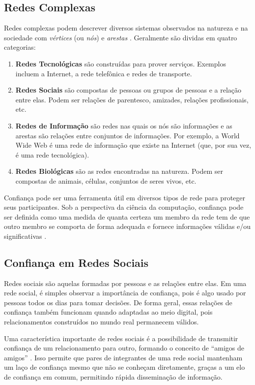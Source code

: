 \begin{resumoextendido}
	\subsection*{Redes Complexas}
	Redes complexas podem descrever diversos sistemas observados na natureza e na sociedade com \textit{vértices} (ou \textit{nós}) e \textit{arestas} \citep{newmannetworks}.
	Geralmente são dividas em quatro categorias:
	\begin{enumerate}
		\item \textbf{Redes Tecnológicas} são construídas para prover serviços. Exemplos incluem a Internet, a rede telefônica e redes de transporte.
		\item \textbf{Redes Sociais} são compostas de pessoas ou grupos de pessoas e a relação entre elas. Podem ser relações de parentesco, amizades, relações profissionais, etc.
		\item \textbf{Redes de Informação} são redes nas quais os nós são informações e as arestas são relações entre conjuntos de informações. Por exemplo, a World Wide Web é uma rede de informação que existe na Internet (que, por sua vez, é uma rede tecnológica).
		\item \textbf{Redes Biológicas} são as redes encontradas na natureza. Podem ser compostas de animais, células, conjuntos de seres vivos, etc.
	\end{enumerate}
	
	Confiança pode ser uma ferramenta útil em diversos tipos de rede para proteger seus participantes.
	Sob a perspectiva da ciência da computação, confiança pode ser definida como uma medida de quanta certeza um membro da rede tem de que outro membro se comporta de forma adequada e fornece informações válidas e/ou significativas \citep{sherchan2013survey}.
	
	\subsection*{Confiança em Redes Sociais}
	Redes sociais são aquelas formadas por pessoas e as relações entre elas. 
	Em uma rede social, é simples observar a importância de confiança, pois é algo usado por pessoas todos os dias para tomar decisões.
	De forma geral, essas relações de confiança também funcionam quando adaptadas ao meio digital, pois relacionamentos construídos no mundo real permanecem válidos.
	
	Uma característica importante de redes sociais é a possibilidade de transmitir confiança de um relacionamento para outro, formando o conceito de ``amigos de amigos'' \citep{boissevain1974friends}.
	Isso permite que pares de integrantes de uma rede social mantenham um laço de confiança mesmo que não se conheçam diretamente, graças a um elo de confiança em comum, permitindo rápida disseminação de informação.
	

\end{resumoextendido}
